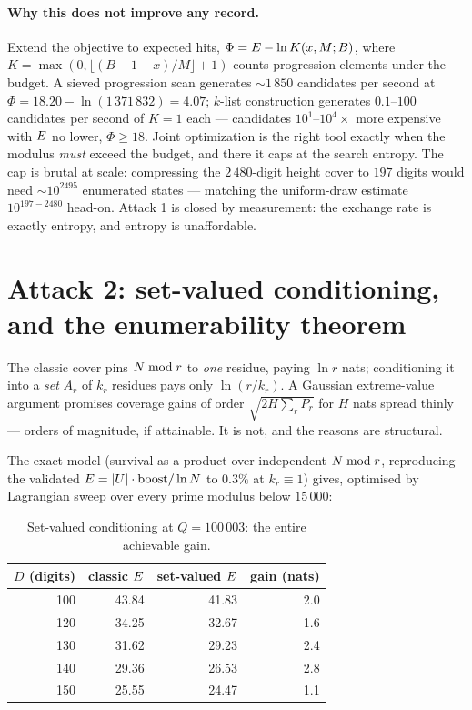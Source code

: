 \paragraph{Why this does not improve any record.} Extend the objective
to expected hits, $\Phi=E-\ln K(x,M;B)$, where
$K=\max(0,\lfloor(B{-}1{-}x)/M\rfloor{+}1)$ counts progression elements
under the budget. A sieved progression scan generates $\sim$$1\,850$
candidates per second at $\Phi=18.20-\ln(1\,371\,832)=4.07$; $k$-list
construction generates $0.1$--$100$ candidates per second of $K=1$
each --- candidates $10^1$--$10^4\times$ more expensive with $E$ no
lower, $\Phi\ge18$. Joint optimization is the right tool exactly when
the modulus \emph{must} exceed the budget, and there it caps at the
search entropy. The cap is brutal at scale: compressing the
$2\,480$-digit height cover to $197$ digits would need
$\sim$$10^{2495}$ enumerated states --- matching the uniform-draw
estimate $10^{197-2480}$ head-on. Attack 1 is closed by measurement:
the exchange rate is exactly entropy, and entropy is unaffordable.

\section{Attack 2: set-valued conditioning, and the enumerability theorem}\label{sec:setvalued}

The classic cover pins $N\bmod r$ to \emph{one} residue, paying
$\ln r$ nats; conditioning it into a \emph{set} $A_r$ of $k_r$
residues pays only $\ln(r/k_r)$. A Gaussian extreme-value argument
promises coverage gains of order $\sqrt{2H\sum_rP_r}$ for $H$ nats
spread thinly --- orders of magnitude, if attainable. It is not, and the
reasons are structural.

The exact model (survival as a product over independent
$N\bmod r$, reproducing the validated
$E=|U|\cdot\mathrm{boost}/\ln N$ to $0.3\%$ at $k_r\equiv1$) gives,
optimised by Lagrangian sweep over every prime modulus below $15\,000$:

\begin{table}[h]
\centering\small
\caption{Set-valued conditioning at $Q=100\,003$: the entire
achievable gain.}\label{tab:setvalued}
\begin{tabular}{rrrr}
\toprule
$D$ (digits) & classic $E$ & set-valued $E$ & gain (nats)\\
\midrule
100 & 43.84 & 41.83 & 2.0\\
120 & 34.25 & 32.67 & 1.6\\
130 & 31.62 & 29.23 & 2.4\\
140 & 29.36 & 26.53 & 2.8\\
150 & 25.55 & 24.47 & 1.1\\
\bottomrule
\end{tabular}
\end{table}

